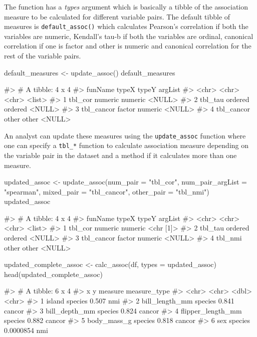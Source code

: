 The function has a \emph{types} argument which is basically a tibble of
the association measure to be calculated for different variable pairs.
The default tibble of measures is \texttt{default\_assoc()} which
calculates Pearson's correlation if both the variables are numeric,
Kendall's tau-b if both the variables are ordinal, canonical correlation
if one is factor and other is numeric and canonical correlation for the
rest of the variable pairs.

\begin{Schunk}
\begin{Sinput}
default_measures <- update_assoc()
default_measures
\end{Sinput}
\begin{Soutput}
#> # A tibble: 4 x 4
#>   funName    typeX   typeY   argList
#>   <chr>      <chr>   <chr>   <list> 
#> 1 tbl_cor    numeric numeric <NULL> 
#> 2 tbl_tau    ordered ordered <NULL> 
#> 3 tbl_cancor factor  numeric <NULL> 
#> 4 tbl_cancor other   other   <NULL>
\end{Soutput}
\end{Schunk}

An analyst can update these measures using the \texttt{update\_assoc}
function where one can specify a \texttt{tbl\_*} function to calculate
association measure depending on the variable pair in the dataset and a
method if it calculates more than one measure.

\begin{Schunk}
\begin{Sinput}
updated_assoc <- update_assoc(num_pair = "tbl_cor",
                              num_pair_argList = "spearman",
                              mixed_pair = "tbl_cancor",
                              other_pair = "tbl_nmi")
updated_assoc
\end{Sinput}
\begin{Soutput}
#> # A tibble: 4 x 4
#>   funName    typeX   typeY   argList  
#>   <chr>      <chr>   <chr>   <list>   
#> 1 tbl_cor    numeric numeric <chr [1]>
#> 2 tbl_tau    ordered ordered <NULL>   
#> 3 tbl_cancor factor  numeric <NULL>   
#> 4 tbl_nmi    other   other   <NULL>
\end{Soutput}
\begin{Sinput}
updated_complete_assoc <- calc_assoc(df, types = updated_assoc)
head(updated_complete_assoc)
\end{Sinput}
\begin{Soutput}
#> # A tibble: 6 x 4
#>   x                 y         measure measure_type
#>   <chr>             <chr>       <dbl> <chr>       
#> 1 island            species 0.507     nmi         
#> 2 bill_length_mm    species 0.841     cancor      
#> 3 bill_depth_mm     species 0.824     cancor      
#> 4 flipper_length_mm species 0.882     cancor      
#> 5 body_mass_g       species 0.818     cancor      
#> 6 sex               species 0.0000854 nmi
\end{Soutput}
\end{Schunk}

